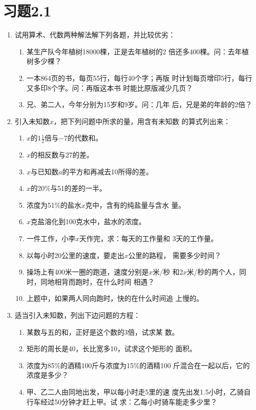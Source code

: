 \section*{习题2.1}

\begin{enumerate}
    \item 试用算术、代数两种解法解下列各题，并比较优劣：
\begin{enumerate}
\item 某生产队今年植树18000棵，正是去年植树的2
倍还多400棵。问：去年植树多少棵？
\item 一本864页的书，每页55行，每行40个字；再版
时计划每页增印5行，每行又多印8个字。问：再版这本书
时能比原版减少几页？
\item 兄、弟二人，今年分别为15岁和9岁。问：几年
后，兄是弟的年龄的2倍？
\end{enumerate}

\item 引入未知数$x$，把下列问题中所求的量，用含有未知数
的算式列出来：
\begin{enumerate}
\item $x$的$1\frac{1}{2}$倍与$-7$的代数和。
\item $x$的相反数与27的差。
\item $x$与已知数$a$的平方和再减去10所得的差。
\item $x$的20\%与51的差的一半。
\item 浓度为51\%的盐水$x$克中，含有的纯盐量与含水
量。
\item $x$克盐溶化到100克水中，盐水的浓度。
\item 一件工作，小李$x$天作完，求：每天的工作量和
3天的工作量。
\item 以每小时20公里的速度，要走出$x$公里的路程，
需要多少时间？
\item 操场上有400米一圈的跑道，速度分别是$x$米/秒
和2$x$米/秒的两个人，同时，同地相背而跑时，在什么时间
相遇？
\item 上题中，如果两人同向跑时，快的在什么时间追
上慢的。
\end{enumerate}

\item  适当引入未知数，列出下边问题的方程：
\begin{enumerate}
\item 某数与五的和，正好是这个数的3倍，试求某
数。
\item 矩形的周长是40，长比宽多10，试求这个矩形的
面积。
\item 浓度为85\%的酒精100斤与浓度为15\%的酒精100
斤混合在一起以后，它的浓度是多少？
\item 甲、乙二人由同地出发，甲以每小时走5里的速
度先出发1.5小时，乙骑自行车经过50分钟才赶上甲。试
求：乙每小时骑车能走多少里？
\end{enumerate}


\end{enumerate}
